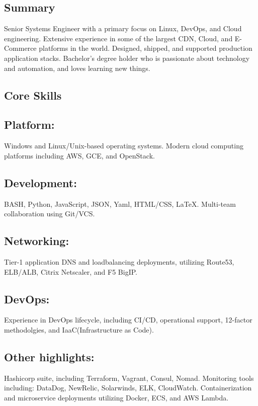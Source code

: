 \documentclass[]{mv-resume}
\begin{document}
\begin{minipage}[t]{0.5\textwidth}
	\begin{summary}
		\section*{Summary}
		Senior Systems Engineer with a primary focus on Linux, DevOps, and Cloud engineering. Extensive experience in some of the largest CDN, Cloud, and E-Commerce platforms in the world. Designed, shipped, and supported production application stacks. Bachelor's degree holder who is passionate about technology and automation, and loves learning new things.
	\end{summary}
	\begin{skills}
		\section*{Core Skills}
		\subsection*{Platform:}
		Windows and Linux/Unix-based operating systems. Modern cloud computing platforms including AWS, GCE, and OpenStack.
		\subsection*{Development:}
		BASH, Python, JavaScript, JSON, Yaml, HTML/CSS, LaTeX. Multi-team collaboration using Git/VCS.
		\subsection*{Networking:}
		Tier-1 application DNS and loadbalancing deployments, utilizing Route53, ELB/ALB, Citrix Netscaler, and F5 BigIP.
		\subsection*{DevOps:}
		Experience in DevOps lifecycle, including CI/CD, operational support, 12-factor methodolgies, and IaaC(Infrastructure as Code).
		\subsection*{Other highlights:}
		Hashicorp suite, including Terraform, Vagrant, Consul, Nomad. Monitoring tools including: DataDog, NewRelic, Solarwinds, ELK, CloudWatch. Containerization and microservice deployments utilizing Docker, ECS, and AWS Lambda.
		

\end{skills}
\end{minipage}
\end{document}
